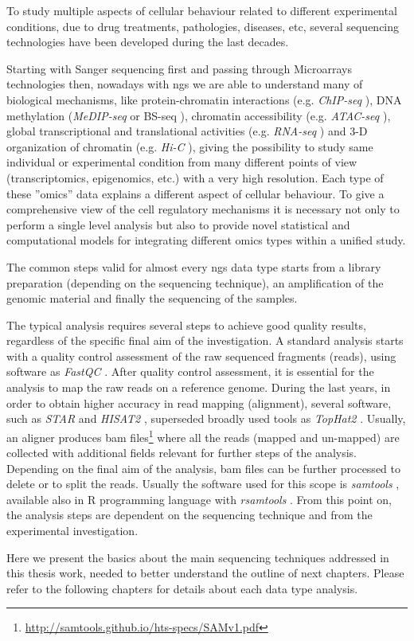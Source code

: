 To study multiple aspects of cellular behaviour related to different experimental conditions, due to drug treatments, pathologies, diseases, etc, several sequencing technologies have been developed during the last decades.

Starting with Sanger sequencing first and passing through Microarrays technologies then, nowadays with \gls{ngs} we are able to understand many of biological mechanisms, like protein-chromatin interactions (e.g. \textit{ChIP-seq} \cite{Park2009}), DNA methylation (\textit{MeDIP-seq} or BS-seq \cite{Frommer1992}), chromatin accessibility (e.g. \textit{ATAC-seq} \cite{Buenrostro2013}), global transcriptional and translational activities (e.g. \textit{RNA-seq} \cite{Wang2009}) and 3-D organization of chromatin (e.g. \textit{Hi-C} \cite{VanBerkum2010}), giving the possibility to study same individual or experimental condition from many different points of view (transcriptomics, epigenomics, etc.) with a very high resolution. Each type of these ''omics'' data explains a different aspect of cellular behaviour. 
To give a comprehensive view of the cell regulatory mechanisms it is necessary not only to perform a single level analysis but also to provide novel statistical and computational models for integrating different omics types within a unified study.

The common steps valid for almost every \gls{ngs} data type starts from a library preparation (depending on the sequencing technique), an amplification of the genomic material and finally the sequencing of the samples.

The typical analysis requires several steps to achieve good quality results, regardless of the specific final aim of the investigation.
A standard analysis starts with a quality control assessment of the raw sequenced fragments (reads), using software as \textit{FastQC} \cite{Andrews2010}.
After quality control assessment, it is essential for the analysis to map the raw reads on a reference genome. 
During the last years, in order to obtain higher accuracy in read mapping (alignment), several software, such as \textit{STAR} \cite{Dobin2013} and \textit{HISAT2} \cite{Kim2015}, superseded broadly used tools as \textit{TopHat2} \cite{Kim2013}.
Usually, an aligner produces \gls{bam} files\footnote{\url{http://samtools.github.io/hts-specs/SAMv1.pdf}} \cite{Li2009} where all the reads (mapped and un-mapped) are collected with additional fields relevant for further steps of the analysis.
Depending on the final aim of the analysis, \gls{bam} files can be further processed to delete or to split the reads. 
Usually the software used for this scope is \textit{samtools} \cite{Li2009, Li2011}, available also in R programming language with \textit{rsamtools} \cite{Morgan}.
From this point on, the analysis steps are dependent on the sequencing technique and from the experimental investigation.

Here we present the basics about the main sequencing techniques addressed in this thesis work, needed to better understand the outline of next chapters.
Please refer to the following chapters for details about each data type analysis.